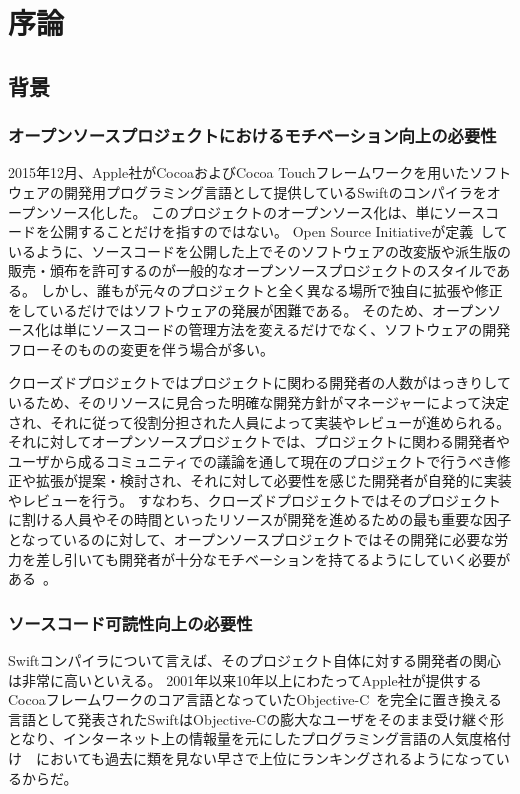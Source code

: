 \chapter{序論}
\label{introduction}

\section{背景}
\label{introduction:background}

\subsection{オープンソースプロジェクトにおけるモチベーション向上の必要性}

2015年12月、Apple社がCocoaおよびCocoa Touchフレームワークを用いたソフトウェアの開発用プログラミング言語として提供しているSwiftのコンパイラをオープンソース化した。
このプロジェクトのオープンソース化は、単にソースコードを公開することだけを指すのではない。
Open Source Initiativeが定義~\cite{opensource}しているように、ソースコードを公開した上でそのソフトウェアの改変版や派生版の販売・頒布を許可するのが一般的なオープンソースプロジェクトのスタイルである。
しかし、誰もが元々のプロジェクトと全く異なる場所で独自に拡張や修正をしているだけではソフトウェアの発展が困難である。
そのため、オープンソース化は単にソースコードの管理方法を変えるだけでなく、ソフトウェアの開発フローそのものの変更を伴う場合が多い。

クローズドプロジェクトではプロジェクトに関わる開発者の人数がはっきりしているため、そのリソースに見合った明確な開発方針がマネージャーによって決定され、それに従って役割分担された人員によって実装やレビューが進められる。
それに対してオープンソースプロジェクトでは、プロジェクトに関わる開発者やユーザから成るコミュニティでの議論を通して現在のプロジェクトで行うべき修正や拡張が提案・検討され、それに対して必要性を感じた開発者が自発的に実装やレビューを行う。
すなわち、クローズドプロジェクトではそのプロジェクトに割ける人員やその時間といったリソースが開発を進めるための最も重要な因子となっているのに対して、オープンソースプロジェクトではその開発に必要な労力を差し引いても開発者が十分なモチベーションを持てるようにしていく必要がある~\cite{raymond}。

\subsection{ソースコード可読性向上の必要性}

Swiftコンパイラについて言えば、そのプロジェクト自体に対する開発者の関心は非常に高いといえる。
2001年以来10年以上にわたってApple社が提供するCocoaフレームワークのコア言語となっていたObjective-C~\cite{objective-c}を完全に置き換える言語として発表されたSwiftはObjective-Cの膨大なユーザをそのまま受け継ぐ形となり、インターネット上の情報量を元にしたプログラミング言語の人気度格付け~\cite{tiobe}~\cite{redmonk}においても過去に類を見ない早さで上位にランキングされるようになっているからだ。

